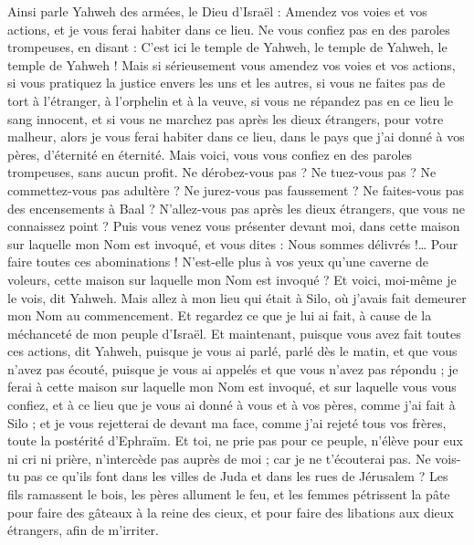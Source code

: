 \begin{multicols}{2}
Ainsi parle Yahweh des armées, le Dieu d'Israël : Amendez vos voies et vos actions, et je vous ferai habiter dans ce lieu.
Ne vous confiez pas en des paroles trompeuses, en disant : C'est ici le temple de Yahweh, le temple de Yahweh, le temple de Yahweh !
Mais si sérieusement vous amendez vos voies et vos actions, si vous pratiquez la justice envers les uns et les autres,
si vous ne faites pas de tort à l'étranger, à l'orphelin et à la veuve, si vous ne répandez pas en ce lieu le sang innocent, et si vous ne marchez pas après les dieux étrangers, pour votre malheur,
alors je vous ferai habiter dans ce lieu, dans le pays que j'ai donné à vos pères, d’éternité en éternité.
Mais voici, vous vous confiez en des paroles trompeuses, sans aucun profit.
Ne dérobez-vous pas ? Ne tuez-vous pas ? Ne commettez-vous pas adultère ? Ne jurez-vous pas faussement ? Ne faites-vous pas des encensements à Baal ? N'allez-vous pas après les dieux étrangers, que vous ne connaissez point ?
Puis vous venez vous présenter devant moi, dans cette maison sur laquelle mon Nom est invoqué, et vous dites : Nous sommes délivrés !… Pour faire toutes ces abominations !
N'est-elle plus à vos yeux qu’une caverne de voleurs, cette maison sur laquelle mon Nom est invoqué ? Et voici, moi-même je le vois, dit Yahweh.
Mais allez à mon lieu qui était à Silo, où j'avais fait demeurer mon Nom au commencement. Et regardez ce que je lui ai fait, à cause de la méchanceté de mon peuple d'Israël.
Et maintenant, puisque vous avez fait toutes ces actions, dit Yahweh, puisque je vous ai parlé, parlé dès le matin, et que vous n'avez pas écouté, puisque je vous ai appelés et que vous n'avez pas répondu ;
je ferai à cette maison sur laquelle mon Nom est invoqué, et sur laquelle vous vous confiez, et à ce lieu que je vous ai donné à vous et à vos pères, comme j'ai fait à Silo ;
et je vous rejetterai de devant ma face, comme j'ai rejeté tous vos frères, toute la postérité d'Ephraïm.
Et toi, ne prie pas pour ce peuple, n’élève pour eux ni cri ni prière, n'intercède pas auprès de moi ; car je ne t'écouterai pas.
Ne vois-tu pas ce qu'ils font dans les villes de Juda et dans les rues de Jérusalem ?
Les fils ramassent le bois, les pères allument le feu, et les femmes pétrissent la pâte pour faire des gâteaux à la reine des cieux, et pour faire des libations aux dieux étrangers, afin de m'irriter.

\end{multicols}
